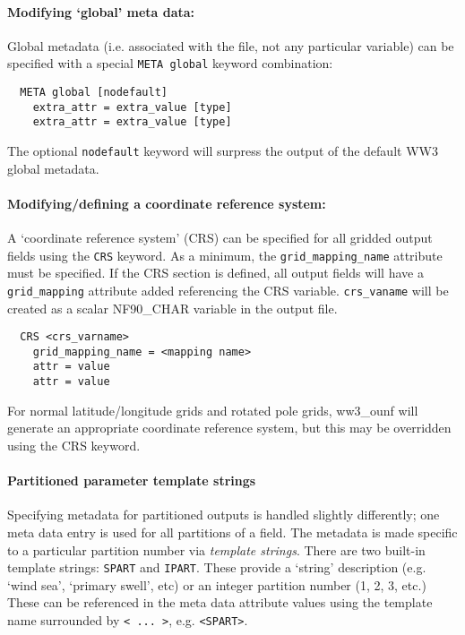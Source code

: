 \noindent
\paragraph{Modifying `global' meta data:}

\noindent
Global metadata (i.e. associated with the file, not any particular variable)
can be specified with a special \texttt{META global} keyword combination:

\begin{verbatim}
  META global [nodefault]
    extra_attr = extra_value [type]
    extra_attr = extra_value [type]
\end{verbatim}

\noindent
The optional \texttt{nodefault} keyword will surpress the output of the
default WW3 global metadata.

\noindent
\paragraph{Modifying/defining a coordinate reference system:}


\noindent
A `coordinate reference system' (CRS) can be specified for all gridded
output fields using the \texttt{CRS} keyword. As a minimum, the
\texttt{grid\_mapping\_name} attribute must be specified. If the CRS
section is defined, all output fields will have a \texttt{grid\_mapping}
attribute added referencing the CRS variable. \texttt{crs\_vaname} will
be created as a scalar NF90\_CHAR variable in the output file.

\begin{verbatim}
  CRS <crs_varname>
    grid_mapping_name = <mapping name>
    attr = value
    attr = value
\end{verbatim}

\noindent
For normal latitude/longitude grids and rotated pole grids, ww3\_ounf will
generate an appropriate coordinate reference system, but this may be
overridden using the CRS keyword.


\noindent
\paragraph{Partitioned parameter template strings}

\noindent
Specifying metadata for partitioned outputs is handled slightly differently;
one meta data entry is used for all partitions of a field. The metadata
is made specific to a particular partition number via \emph{template strings}.
There are two built-in template strings: \texttt{SPART} and \texttt{IPART}.
These provide a `string' description (e.g. `wind sea', `primary swell', etc) or
an integer partition number (1, 2, 3, etc.) These can be referenced in the meta data
attribute values using the template name surrounded by \texttt{< ... >},
e.g. \texttt{<SPART>}.

